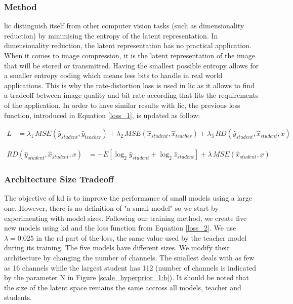 \subsubsection{Method}
\acrshort{lic} distinguish itself from other computer vision tasks (such as dimensionality reduction) by minimising the entropy of the latent representation. In dimensionality reduction, the latent representation has no practical application. When it comes to image compression, it is the latent representation of the image that will be stored or transmitted. Having the smallest possible entropy allows for a smaller entropy coding which means less bits to handle in real world applications. This is why the rate-distortion loss is used in \acrshort{lic} as it allows to find a tradeoff between image quality and bit rate according that fits the requirements of the application. In order to have similar results with \acrshort{lic}, the previous loss function, introduced in Equation \eqref{loss_1}, is updated as follow:

\begin{align}
    L &= \lambda_{1}\, MSE(\hat{y}_{student}, \hat{y}_{teacher}) + \lambda_{2}\, MSE(\hat{x}_{student}, \hat{x}_{teacher}) + \lambda_{3}\, RD(\hat{y}_{student}, \hat{x}_{student}, x)\label{loss_2}
\end{align}

\begin{align}
RD(\hat{y}_{student}, \hat{x}_{student}, x) &= -E[\log_{2}\hat{y}_{student} + \log_{2}\hat{z}_{student}] + \lambda\, MSE(\hat{x}_{student}, x)
\end{align}

\subsubsection{Architecture Size Tradeoff}
\label{architecture_size_tradeoff}
The objective of \acrshort{kd} is to improve the performance of small models using a large one. However, there is no definition of "a small model" so we start by experimenting with model sizes. Following our training method, we create five new models using \acrshort{kd} and the loss function from Equation \ref{loss_2}. We use \(\lambda = 0.025\) in the \acrshort{rd} part of the loss, the same value used by the teacher model during its training. The five models have different sizes. We modify their architecture by changing the number of channels. The smallest deals with as few as 16 channels while the largest student has 112 (number of channels is indicated by the parameter N in Figure \ref{scale_hyperprior_1:b}). It should be noted that the size of the latent space remains the same accross all models, teacher and students.

